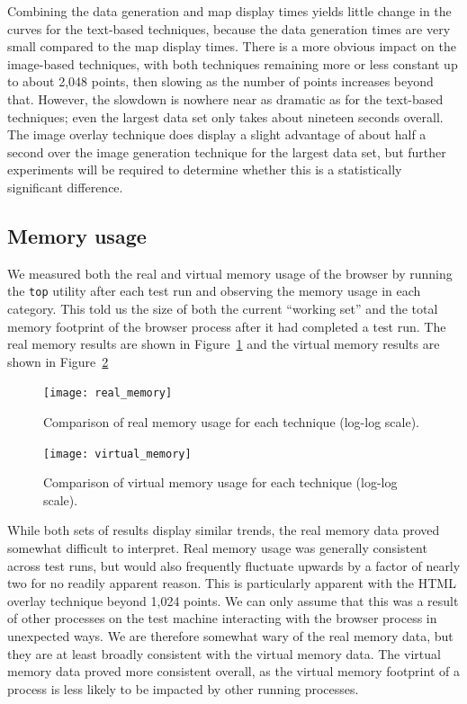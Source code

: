 \documentclass[acmtocl,acmnow]{acmtrans2m}
\begin{document}
Combining the data generation and map display times yields little change
in the curves for the text-based techniques, because the data generation
times are very small compared to the map display times. There is a more
obvious impact on the image-based techniques, with both techniques
remaining more or less constant up to about 2,048 points, then slowing
as the number of points increases beyond that. However, the slowdown is
nowhere near as dramatic as for the text-based techniques; even the
largest data set only takes about nineteen seconds overall. The image
overlay technique does display a slight advantage of about half a second
over the image generation technique for the largest data set, but
further experiments will be required to determine whether this is a
statistically significant difference.


\subsection{Memory usage}

We measured both the real and virtual memory usage of the browser by
running the \texttt{top} utility after each test run and observing the
memory usage in each category. This told us the size of both the current
``working set'' and the total memory footprint of the browser process
after it had completed a test run. The real memory results are shown in
Figure~\ref{fig-real-memory} and the virtual memory results are shown in 
Figure~\ref{fig-virtual-memory}


\begin{figure}
	\centering
	\texttt{[image: real\_memory]}
	\caption{Comparison of real memory usage for each technique (log-log scale).}
	\label{fig-real-memory}
\end{figure}


\begin{figure}
	\centering
	\texttt{[image: virtual\_memory]}
	\caption{Comparison of virtual memory usage for each technique (log-log scale).}
	\label{fig-virtual-memory}
\end{figure}


While both sets of results display similar trends, the real memory data
proved somewhat difficult to interpret. Real memory usage was generally
consistent across test runs, but would also frequently fluctuate upwards
by a factor of nearly two for no readily apparent reason. This is
particularly apparent with the HTML overlay technique beyond 1,024
points. We can only assume that this was a result of other processes on
the test machine interacting with the browser process in unexpected
ways. We are therefore somewhat wary of the real memory data, but they
are at least broadly consistent with the virtual memory data. The
virtual memory data proved more consistent overall, as the virtual
memory footprint of a process is less likely to be impacted by other
running processes.
\end{document}
